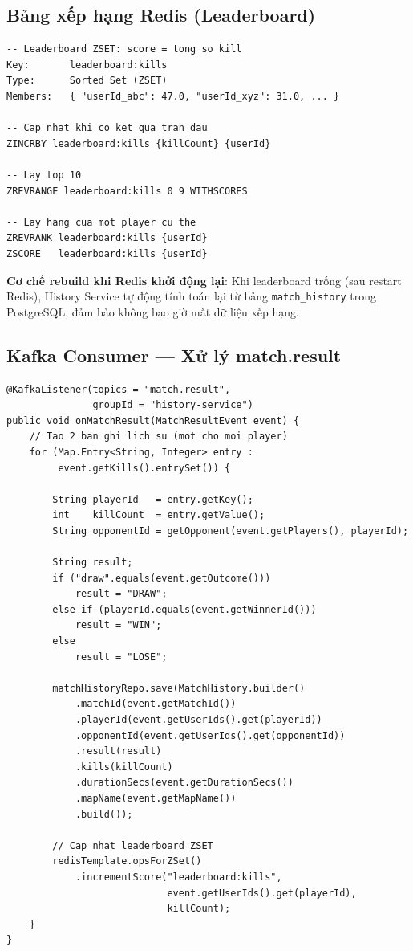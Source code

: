 \documentclass[12pt,a4paper]{report}
\begin{document}
\subsection{Bảng xếp hạng Redis (Leaderboard)}

\begin{lstlisting}[style=bashStyle, caption={Cấu trúc và thao tác leaderboard trong Redis}, label={lst:leaderboard}]
-- Leaderboard ZSET: score = tong so kill
Key:       leaderboard:kills
Type:      Sorted Set (ZSET)
Members:   { "userId_abc": 47.0, "userId_xyz": 31.0, ... }

-- Cap nhat khi co ket qua tran dau
ZINCRBY leaderboard:kills {killCount} {userId}

-- Lay top 10
ZREVRANGE leaderboard:kills 0 9 WITHSCORES

-- Lay hang cua mot player cu the
ZREVRANK leaderboard:kills {userId}
ZSCORE   leaderboard:kills {userId}
\end{lstlisting}

\textbf{Cơ chế rebuild khi Redis khởi động lại}: Khi leaderboard trống (sau restart Redis), History Service tự động tính toán lại từ bảng \texttt{match\_history} trong PostgreSQL, đảm bảo không bao giờ mất dữ liệu xếp hạng.

\subsection{Kafka Consumer --- Xử lý match.result}

\begin{lstlisting}[style=javaStyle, caption={Xử lý sự kiện match.result và cập nhật leaderboard}, label={lst:histconsumer}]
@KafkaListener(topics = "match.result",
               groupId = "history-service")
public void onMatchResult(MatchResultEvent event) {
    // Tao 2 ban ghi lich su (mot cho moi player)
    for (Map.Entry<String, Integer> entry :
         event.getKills().entrySet()) {

        String playerId   = entry.getKey();
        int    killCount  = entry.getValue();
        String opponentId = getOpponent(event.getPlayers(), playerId);

        String result;
        if ("draw".equals(event.getOutcome()))
            result = "DRAW";
        else if (playerId.equals(event.getWinnerId()))
            result = "WIN";
        else
            result = "LOSE";

        matchHistoryRepo.save(MatchHistory.builder()
            .matchId(event.getMatchId())
            .playerId(event.getUserIds().get(playerId))
            .opponentId(event.getUserIds().get(opponentId))
            .result(result)
            .kills(killCount)
            .durationSecs(event.getDurationSecs())
            .mapName(event.getMapName())
            .build());

        // Cap nhat leaderboard ZSET
        redisTemplate.opsForZSet()
            .incrementScore("leaderboard:kills",
                            event.getUserIds().get(playerId),
                            killCount);
    }
}
\end{lstlisting}
\end{document}
